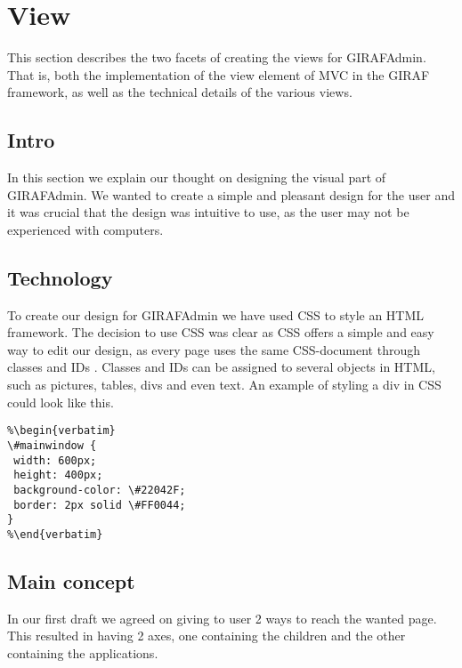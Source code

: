 \section{View}
\label{view}
This section describes the two facets of creating the views for GIRAFAdmin. That is, both the implementation of the view element of MVC in the GIRAF framework, as well as the technical details of the various views.

\subsection{Intro}
In this section we explain our thought on designing the visual part of GIRAFAdmin. We wanted to create a simple and pleasant design for the user and it was crucial that the design was intuitive to use, as the user may not be experienced with computers. 


\subsection{Technology}
To create our design for GIRAFAdmin we have used CSS to style an HTML framework. The decision to use CSS was clear as CSS offers a simple and easy way to edit our design, as every page uses the same CSS-document through classes and IDs . Classes and IDs can be assigned to several objects in HTML, such as pictures, tables, divs and even text. An example of styling a div in CSS could look like this. 

\begin{lstlisting}
%\begin{verbatim}
\#mainwindow {	
 width: 600px;
 height: 400px;
 background-color: \#22042F;
 border: 2px solid \#FF0044;
}
%\end{verbatim}
\end{lstlisting}


\subsection{Main concept}
In our first draft we agreed on giving to user 2 ways to reach the wanted page. This resulted in having 2 axes, one containing the children and the other containing the applications. 


